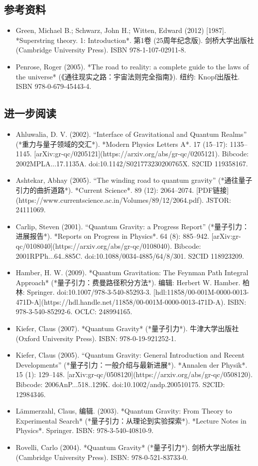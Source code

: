 \subsection{参考资料}
\begin{itemize}
\item Green, Michael B.; Schwarz, John H.; Witten, Edward (2012) [1987]. *Superstring theory. 1: Introduction*. 第1卷 (25周年纪念版). 剑桥大学出版社 (Cambridge University Press). ISBN 978-1-107-02911-8.
\item Penrose, Roger (2005). *The road to reality: a complete guide to the laws of the universe* (《通往现实之路：宇宙法则完全指南》). 纽约: Knopf出版社. ISBN 978-0-679-45443-4.
\end{itemize}
\subsection{进一步阅读}

\begin{itemize}
\item Ahluwalia, D. V. (2002). “Interface of Gravitational and Quantum Realms” (*重力与量子领域的交汇*). *Modern Physics Letters A*. 17 (15–17): 1135–1145. [arXiv:gr-qc/0205121](https://arxiv.org/abs/gr-qc/0205121). Bibcode: 2002MPLA...17.1135A. doi:10.1142/S021773230200765X. S2CID 119358167.
\item Ashtekar, Abhay (2005). “The winding road to quantum gravity” (*通往量子引力的曲折道路*). *Current Science*. 89 (12): 2064–2074. [PDF链接](https://www.currentscience.ac.in/Volumes/89/12/2064.pdf). JSTOR: 24111069.
\item Carlip, Steven (2001). “Quantum Gravity: a Progress Report” (*量子引力：进展报告*). *Reports on Progress in Physics*. 64 (8): 885–942. [arXiv:gr-qc/0108040](https://arxiv.org/abs/gr-qc/0108040). Bibcode: 2001RPPh...64..885C. doi:10.1088/0034-4885/64/8/301. S2CID 118923209.
\item Hamber, H. W. (2009). *Quantum Gravitation: The Feynman Path Integral Approach* (*量子引力：费曼路径积分方法*). 编辑: Herbert W. Hamber. 柏林: Springer. doi:10.1007/978-3-540-85293-3. [hdl:11858/00-001M-0000-0013-471D-A](https://hdl.handle.net/11858/00-001M-0000-0013-471D-A). ISBN: 978-3-540-85292-6. OCLC: 248994165.
\item Kiefer, Claus (2007). *Quantum Gravity* (*量子引力*). 牛津大学出版社 (Oxford University Press). ISBN: 978-0-19-921252-1.
\item Kiefer, Claus (2005). “Quantum Gravity: General Introduction and Recent Developments” (*量子引力：一般介绍与最新进展*). *Annalen der Physik*. 15 (1): 129–148. [arXiv:gr-qc/0508120](https://arxiv.org/abs/gr-qc/0508120). Bibcode: 2006AnP...518..129K. doi:10.1002/andp.200510175. S2CID: 12984346.
\item Lämmerzahl, Claus, 编辑. (2003). *Quantum Gravity: From Theory to Experimental Search* (*量子引力：从理论到实验探索*). *Lecture Notes in Physics*. Springer. ISBN: 978-3-540-40810-9.
\item Rovelli, Carlo (2004). *Quantum Gravity* (*量子引力*). 剑桥大学出版社 (Cambridge University Press). ISBN: 978-0-521-83733-0.
\end{itemize}
